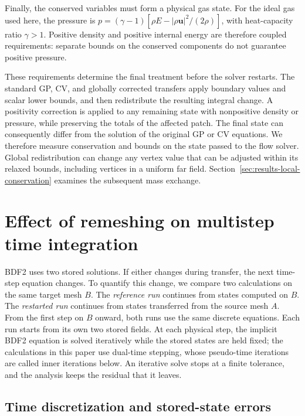 \documentclass[a4paper,fleqn]{cas-sc}
\begin{document}
Finally, the conserved variables must form a physical gas state. For the ideal gas used here, the pressure is $p=(\gamma-1)[\rho E-|\rho\boldsymbol u|^2/(2\rho)]$, with heat-capacity ratio $\gamma>1$. Positive density and positive internal energy are therefore coupled requirements: separate bounds on the conserved components do not guarantee positive pressure.

These requirements determine the final treatment before the solver restarts. The standard GP, CV, and globally corrected transfers apply boundary values and scalar lower bounds, and then redistribute the resulting integral change. A positivity correction is applied to any remaining state with nonpositive density or pressure, while preserving the totals of the affected patch. The final state can consequently differ from the solution of the original GP or CV equations. We therefore measure conservation and bounds on the state passed to the flow solver. Global redistribution can change any vertex value that can be adjusted within its relaxed bounds, including vertices in a uniform far field. Section~\ref{sec:results-local-conservation} examines the subsequent mass exchange.

\section{Effect of remeshing on multistep time integration}
\label{sec:restart-consistency}

BDF2 uses two stored solutions. If either changes during transfer, the next time-step equation changes. To quantify this change, we compare two calculations on the same target mesh $B$. The \emph{reference run} continues from states computed on $B$. The \emph{restarted run} continues from states transferred from the source mesh $A$. From the first step on $B$ onward, both runs use the same discrete equations. Each run starts from its own two stored fields. At each physical step, the implicit BDF2 equation is solved iteratively while the stored states are held fixed; the calculations in this paper use dual-time stepping, whose pseudo-time iterations are called inner iterations below. An iterative solve stops at a finite tolerance, and the analysis keeps the residual that it leaves.

\subsection{Time discretization and stored-state errors}
\label{sec:unsteady-discretization}
\label{sec:native-transfer-decomposition}
\end{document}
